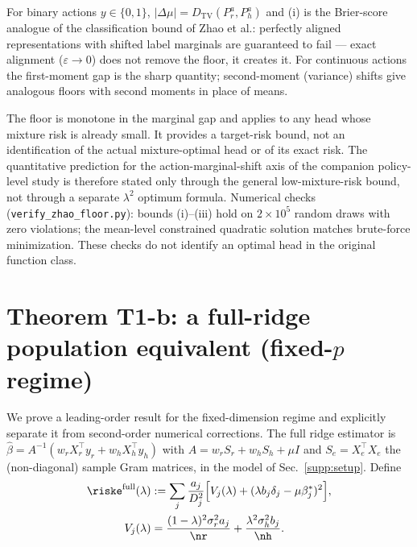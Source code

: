\begin{remark}
For binary actions $y \in \{0,1\}$, $|\Delta\mu| = D_{\mathrm{TV}}(P_r^a, P_h^a)$ and (i) is the Brier-score analogue of the classification bound of Zhao et al.: perfectly aligned representations with shifted label marginals are guaranteed to fail --- exact alignment ($\varepsilon \to 0$) does not remove the floor, it creates it.
For continuous actions the first-moment gap is the sharp quantity; second-moment (variance) shifts give analogous floors with second moments in place of means.
\end{remark}

\begin{remark}
The floor is monotone in the marginal gap and applies to any head whose mixture risk is already small. It provides a target-risk bound, not an identification of the actual mixture-optimal head or of its exact risk.
The quantitative prediction for the action-marginal-shift axis of the companion policy-level study is therefore stated only through the general low-mixture-risk bound, not through a separate $\lambda^2$ optimum formula.
Numerical checks (\texttt{verify\_zhao\_floor.py}): bounds (i)--(iii) hold on $2\times10^5$ random draws with zero violations; the mean-level constrained quadratic solution matches brute-force minimization. These checks do not identify an optimal head in the original function class.
\end{remark}

\section{Theorem T1-b: a full-ridge population equivalent (fixed-$p$ regime)}
\label{supp:t1b}

We prove a leading-order result for the fixed-dimension regime and explicitly separate it from second-order numerical corrections.
The full ridge estimator is $\hat\beta = A^{-1}(w_r X_r^\top y_r + w_h X_h^\top y_h)$ with $A = w_r S_r + w_h S_h + \mu I$ and $S_e = X_e^\top X_e$ the (non-diagonal) sample Gram matrices, in the model of Sec.~\ref{supp:setup}.
Define
\begin{align}
  \riske^{\mathrm{full}}(\lambda)
  &:= \sum_j \frac{a_j}{D_j^2}\Big[V_j(\lambda)+(\lambda b_j\delta_j-\mu\beta^*_j)^2\Big], \notag\\
  V_j(\lambda)&=\frac{(1-\lambda)^2\sigma_r^2a_j}{\nr}+\frac{\lambda^2\sigma_h^2b_j}{\nh}.
  \label{supp:eq:t1b-pop}
\end{align}

